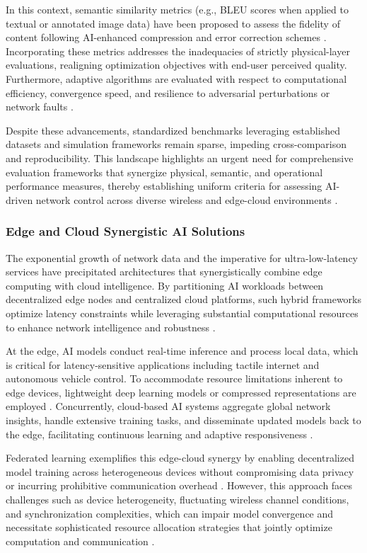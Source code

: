 In this context, semantic similarity metrics (e.g., BLEU scores when applied to textual or annotated image data) have been proposed to assess the fidelity of content following AI-enhanced compression and error correction schemes \cite{ref1,ref3,ref50}. Incorporating these metrics addresses the inadequacies of strictly physical-layer evaluations, realigning optimization objectives with end-user perceived quality. Furthermore, adaptive algorithms are evaluated with respect to computational efficiency, convergence speed, and resilience to adversarial perturbations or network faults \cite{ref5,ref7,ref10}.

Despite these advancements, standardized benchmarks leveraging established datasets and simulation frameworks remain sparse, impeding cross-comparison and reproducibility. This landscape highlights an urgent need for comprehensive evaluation frameworks that synergize physical, semantic, and operational performance measures, thereby establishing uniform criteria for assessing AI-driven network control across diverse wireless and edge-cloud environments \cite{ref50}.

\subsubsection{Edge and Cloud Synergistic AI Solutions}

The exponential growth of network data and the imperative for ultra-low-latency services have precipitated architectures that synergistically combine edge computing with cloud intelligence. By partitioning AI workloads between decentralized edge nodes and centralized cloud platforms, such hybrid frameworks optimize latency constraints while leveraging substantial computational resources to enhance network intelligence and robustness \cite{ref8,ref9,ref13,ref16,ref49,ref50}.

At the edge, AI models conduct real-time inference and process local data, which is critical for latency-sensitive applications including tactile internet and autonomous vehicle control. To accommodate resource limitations inherent to edge devices, lightweight deep learning models or compressed representations are employed \cite{ref8,ref13}. Concurrently, cloud-based AI systems aggregate global network insights, handle extensive training tasks, and disseminate updated models back to the edge, facilitating continuous learning and adaptive responsiveness \cite{ref9,ref16}.

Federated learning exemplifies this edge-cloud synergy by enabling decentralized model training across heterogeneous devices without compromising data privacy or incurring prohibitive communication overhead \cite{ref10}. However, this approach faces challenges such as device heterogeneity, fluctuating wireless channel conditions, and synchronization complexities, which can impair model convergence and necessitate sophisticated resource allocation strategies that jointly optimize computation and communication \cite{ref9,ref10}.

